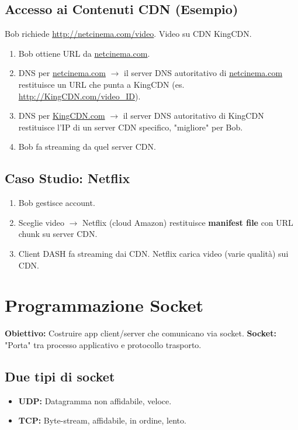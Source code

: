 \subsection{Accesso ai Contenuti CDN (Esempio)}
Bob richiede \url{http://netcinema.com/video}. Video su CDN KingCDN.
\begin{enumerate}
    \item Bob ottiene URL da \url{netcinema.com}.
    \item DNS per \url{netcinema.com} $\rightarrow$ il server DNS autoritativo di \url{netcinema.com} restituisce un URL che punta a KingCDN (es. \url{http://KingCDN.com/video_ID}).
    \item DNS per \url{KingCDN.com} $\rightarrow$ il server DNS autoritativo di KingCDN restituisce l'IP di un server CDN specifico, "migliore" per Bob.
    \item Bob fa streaming da quel server CDN.
\end{enumerate}

\subsection{Caso Studio: Netflix}
\begin{enumerate}
    \item Bob gestisce account.
    \item Sceglie video $\rightarrow$ Netflix (cloud Amazon) restituisce \textbf{manifest file} con URL chunk su server CDN.
    \item Client DASH fa streaming dai CDN. Netflix carica video (varie qualità) sui CDN.
\end{enumerate}

\section{Programmazione Socket}
\textbf{Obiettivo:} Costruire app client/server che comunicano via socket.
\textbf{Socket:} "Porta" tra processo applicativo e protocollo trasporto.

\subsection{Due tipi di socket}
\begin{itemize}
    \item \textbf{UDP:} Datagramma non affidabile, veloce.
    \item \textbf{TCP:} Byte-stream, affidabile, in ordine, lento.
\end{itemize}


